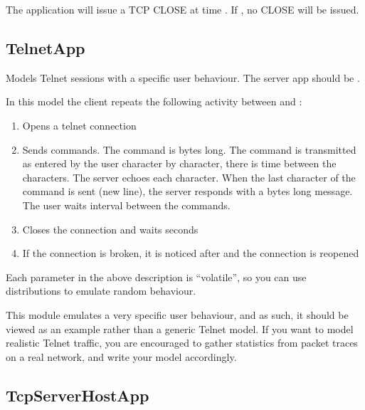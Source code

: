 The application will issue a TCP CLOSE at time . If
, no CLOSE will be issued.



\subsection{TelnetApp}
\label{sec:apps:telnetapp}

Models Telnet sessions with a specific user behaviour.
The server app should be .

In this model the client repeats the following activity
between  and :

\begin{enumerate}
\item Opens a telnet connection
\item Sends  commands. The command is  bytes long.
      The command is transmitted as entered by the user character by character,
      there is  time between the characters. The server echoes
      each character. When the last character of the command is sent (new line),
      the server responds with a  bytes long message.
      The user waits  interval between the commands.
\item Closes the connection and waits  seconds
\item If the connection is broken, it is noticed after 
      and the connection is reopened
\end{enumerate}

Each parameter in the above description is ``volatile'', so you can
use distributions to emulate random behaviour.

\begin{note}
This module emulates a very specific user behaviour, and as such,
it should be viewed as an example rather than a generic Telnet model.
If you want to model realistic Telnet traffic, you are encouraged
to gather statistics from packet traces on a real network, and
write your model accordingly.
\end{note}

\subsection{TcpServerHostApp}
\label{sec:apps:tcpserverhostapp}

